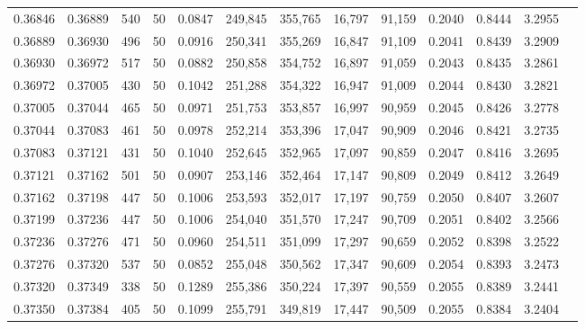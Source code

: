 \begin{tabular}{rrrrrrrrrrrrr}
0.36846 & 0.36889 &   540 &  50 &                                     0.0847 & 249,845 & 355,765 &  16,797 &  91,159 & 0.2040 & 0.8444 & 3.2955 \\
0.36889 & 0.36930 &   496 &  50 &                                     0.0916 & 250,341 & 355,269 &  16,847 &  91,109 & 0.2041 & 0.8439 & 3.2909 \\
0.36930 & 0.36972 &   517 &  50 &                                     0.0882 & 250,858 & 354,752 &  16,897 &  91,059 & 0.2043 & 0.8435 & 3.2861 \\
0.36972 & 0.37005 &   430 &  50 &                                     0.1042 & 251,288 & 354,322 &  16,947 &  91,009 & 0.2044 & 0.8430 & 3.2821 \\
0.37005 & 0.37044 &   465 &  50 &                                     0.0971 & 251,753 & 353,857 &  16,997 &  90,959 & 0.2045 & 0.8426 & 3.2778 \\
0.37044 & 0.37083 &   461 &  50 &                                     0.0978 & 252,214 & 353,396 &  17,047 &  90,909 & 0.2046 & 0.8421 & 3.2735 \\
0.37083 & 0.37121 &   431 &  50 &                                     0.1040 & 252,645 & 352,965 &  17,097 &  90,859 & 0.2047 & 0.8416 & 3.2695 \\
0.37121 & 0.37162 &   501 &  50 &                                     0.0907 & 253,146 & 352,464 &  17,147 &  90,809 & 0.2049 & 0.8412 & 3.2649 \\
0.37162 & 0.37198 &   447 &  50 &                                     0.1006 & 253,593 & 352,017 &  17,197 &  90,759 & 0.2050 & 0.8407 & 3.2607 \\
0.37199 & 0.37236 &   447 &  50 &                                     0.1006 & 254,040 & 351,570 &  17,247 &  90,709 & 0.2051 & 0.8402 & 3.2566 \\
0.37236 & 0.37276 &   471 &  50 &                                     0.0960 & 254,511 & 351,099 &  17,297 &  90,659 & 0.2052 & 0.8398 & 3.2522 \\
0.37276 & 0.37320 &   537 &  50 &                                     0.0852 & 255,048 & 350,562 &  17,347 &  90,609 & 0.2054 & 0.8393 & 3.2473 \\
0.37320 & 0.37349 &   338 &  50 &                                     0.1289 & 255,386 & 350,224 &  17,397 &  90,559 & 0.2055 & 0.8389 & 3.2441 \\
0.37350 & 0.37384 &   405 &  50 &                                     0.1099 & 255,791 & 349,819 &  17,447 &  90,509 & 0.2055 & 0.8384 & 3.2404 \\

\end{tabular}
